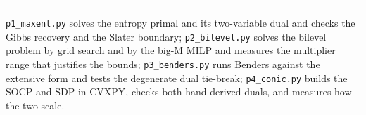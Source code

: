 \documentclass[11pt]{article}
\theoremstyle{definition}
\begin{document}
\vspace{1em}
\hrule
\vspace{0.6em}
{\small \sloppy \texttt{p1\_maxent.py} solves the entropy primal and its
two-variable dual and checks the Gibbs recovery and the Slater
boundary; \texttt{p2\_bilevel.py} solves the bilevel problem by grid
search and by the big-M MILP and measures the multiplier range that
justifies the bounds; \texttt{p3\_benders.py} runs Benders against the
extensive form and tests the degenerate dual tie-break;
\texttt{p4\_conic.py} builds the SOCP and SDP in CVXPY, checks both
hand-derived duals, and measures how the two scale.\par}
\end{document}

